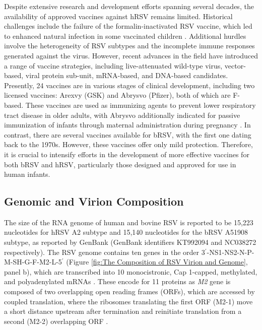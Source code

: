 Despite extensive research and development efforts spanning several decades, the availability of approved vaccines against hRSV remains limited. Historical challenges include the failure of the formalin-inactivated RSV vaccine, which led to enhanced natural infection in some vaccinated children \cite{Fulginiti1969RespiratoryVaccine., Kim1969RespiratoryVaccine.}. Additional hurdles involve the heterogeneity of RSV subtypes and the incomplete immune responses generated against the virus. However, recent advances in the field have introduced a range of vaccine strategies, including live-attenuated wild-type virus, vector-based, viral protein sub-unit, mRNA-based, and DNA-based candidates. Presently, 24 vaccines are in various stages of clinical development, including two licensed vaccines: Arexvy (GSK) and Abrysvo (Pfizer), both of which are F-based. These vaccines are used as immunizing agents to prevent lower respiratory tract disease in older adults, with Abrysvo additionally indicated for passive immunization of infants through maternal administration during pregnancy \cite{Topalidou2023RespiratoryVaccines}. In contrast, there are several vaccines available for bRSV, with the first one dating back to the 1970s. However, these vaccines offer only mild protection. Therefore, it is crucial to intensify efforts in the development of more effective vaccines for both bRSV \cite{Ellis2017HowCattle} and hRSV, particularly those designed and approved for use in human infants.

\subsection{Genomic and Virion Composition} \label{subsec:Genomic and Virion Composition}
The size of the RNA genome of human and bovine RSV is reported to be 15,223 nucleotides for hRSV A2 subtype and 15,140 nucleotides for the bRSV A51908 subtype, as reported by GenBank (GenBank identifiers KT992094 and NC038272 respectively). The RSV genome contains ten genes in the order 3$^{\prime}$-NS1-NS2-N-P-M-SH-G-F-M2-L-5$^{\prime}$ (Figure \ref{fig:The Composition of RSV Virion and Genome}, panel b), which are transcribed into 10 monocistronic, Cap 1-capped, methylated, and polyadenylated mRNAs \cite{Collins2013RespiratoryDisease, Bohmwald2016HumanPathology}. These encode for 11 proteins as \textit{M2} gene is composed of two overlapping open reading frames (ORFs), which are accessed by coupled translation, where the ribosomes translating the first ORF (M2-1) move a short distance upstream after termination and reinitiate translation from a second (M2-2) overlapping ORF \cite{Gould2007CouplediPneumovirinae/i}.

